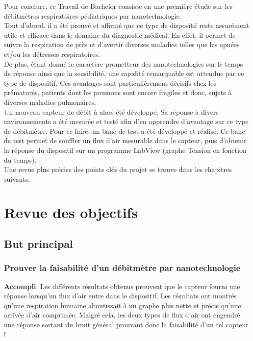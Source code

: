 Pour conclure, ce Travail de Bachelor consiste en une première étude sur les débitmètres respiratoires pédiatriques par nanotechnologie. \\
Tout d'abord, il a été prouvé et affirmé que ce type de dispositif reste assurément utile et efficace dans le domaine du diagnostic médical. 
En effet, il permet de suivre la respiration de près et d'avertir diverses maladies telles que les apnées et/ou les détresses respiratoires. \\

De plus, étant donné le caractère prometteur des nanotechnologies sur le temps de réponse ainsi que la sensibilité, une rapidité remarquable 
est attendue par ce type de dispositif. Ces avantages sont particulièrement décisifs chez les prématurés, patients dont les poumons sont encore 
fragiles et donc, sujets à diverses maladies pulmonaires.\\

Un nouveau capteur de débit à alors été développé. Sa réponse à divers environnements a été mesurée et testé afin d'en apprendre d'avantage sur 
ce type de débitmètre. Pour ce faire, un banc de test a été développé et réalisé. Ce banc de test permet de souffler un flux d'air mesurable dans 
le capteur, puis d'obtenir la réponse du dispositif sur un programme LabView (graphe Tension en fonction du temps). \\

Une revue plus précise des points clés du projet se trouve dans les chapitres suivants. 

\section{Revue des objectifs}
\subsection{But principal}
\subsubsection{Prouver la faisabilité d'un débitmètre par nanotechnologie}
\textbf{Accompli}. Les différents résultats obtenus prouvent que le capteur fourni une réponse lorsqu'un flux d'air entre dans le dispositif. Les 
résultats ont montrés qu'une respiration humaine aboutissait à un graphe plus nette et précis qu'une arrivée d'air comprimée. Malgré cela, 
les deux types de flux d'air ont engendré une réponse sortant du bruit général prouvant donc la faisabilité d'un tel capteur !

